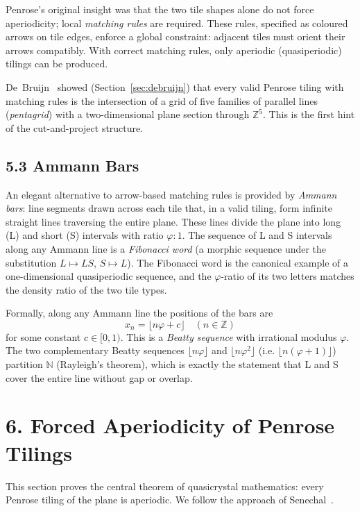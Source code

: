 Penrose's original insight was that the two tile
shapes alone do not force aperiodicity; local
\emph{matching rules} are required. These rules,
specified as coloured arrows on tile edges, enforce
a global constraint: adjacent tiles must orient
their arrows compatibly. With correct matching
rules, only aperiodic (quasiperiodic) tilings can
be produced.

De~Bruijn~\cite{debruijn1981} showed
(Section~\ref{sec:debruijn}) that every valid
Penrose tiling with matching rules is the
intersection of a grid of five families of
parallel lines (\emph{pentagrid}) with a
two-dimensional plane section through
\(\mathbb{Z}^5\). This is the first hint of the
cut-and-project structure.

\subsection{5.3 Ammann Bars}\label{sec:ammann-bars}

An elegant alternative to arrow-based matching
rules is provided by \emph{Ammann bars}: line
segments drawn across each tile that, in a valid
tiling, form infinite straight lines traversing
the entire plane. These lines divide the plane
into long (L) and short (S) intervals with ratio
\(\varphi : 1\). The sequence of L and S
intervals along any Ammann line is a
\emph{Fibonacci word} (a morphic sequence under
the substitution \(L \mapsto LS\),
\(S \mapsto L\)). The Fibonacci word is the
canonical example of a one-dimensional
quasiperiodic sequence, and the
\(\varphi\)-ratio of its two letters matches the
density ratio of the two tile types.

Formally, along any Ammann line the positions of
the bars are
\[x_n = \lfloor n\varphi + c \rfloor \quad (n \in \mathbb{Z})\]
for some constant \(c \in [0,1)\). This is a
\emph{Beatty sequence} with irrational modulus
\(\varphi\). The two complementary Beatty
sequences \(\lfloor n\varphi \rfloor\) and
\(\lfloor n\varphi^2 \rfloor\) (i.e.
\(\lfloor n(\varphi+1) \rfloor\)) partition
\(\mathbb{N}\) (Rayleigh's theorem), which is
exactly the statement that L and S cover the
entire line without gap or overlap.

\section{6. Forced Aperiodicity of Penrose
Tilings}\label{sec:penrose-aperiodic-theorem}

This section proves the central theorem of
quasicrystal mathematics: every Penrose tiling of
the plane is aperiodic. We follow the approach
of Senechal~\cite{senechal_quasicrystals}.


